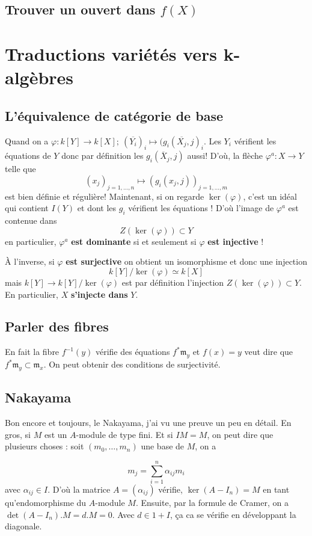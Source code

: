 \documentclass[a4paper,12pt]{book}
\newcommand{\m}{\mathfrak{m}}
\theoremstyle{plain}
\theoremstyle{definition}
\theoremstyle{remark}
\begin{document}
\section{Trouver un ouvert dans $f(X)$}

\chapter{Traductions variétés vers k-algèbres}
\section{L'équivalence de catégorie de base}
Quand on a $\varphi\colon k[Y]\to k[X];~(\overline{Y_i})_i\mapsto 
(g_i(\overline{X_j},j)_i$. Les $Y_i$ vérifient les équations de $Y$
donc par définition les $g_i(\overline{X}_j,j)$ aussi! D'où, la flèche 
$\varphi^a\colon X\to Y$ telle que 
\[(x_j)_{j=1,\ldots,n}\mapsto (g_i(x_j,j))_{j=1,\ldots, m}\]
est bien définie et régulière! Maintenant, si on regarde $\ker(\varphi)$,
c'est un idéal qui contient $I(Y)$ et dont les $g_i$ vérifient les 
équations ! D'où l'image de $\varphi^a$ est contenue dans 
\[Z(\ker(\varphi))\subset Y\]
en particulier, $\varphi^a$ \textbf{est dominante} si et seulement si 
$\varphi$ \textbf{est injective} !

À l'inverse, si $\varphi$ \textbf{est surjective} on obtient un
isomorphisme et donc une injection 
\[k[Y]/\ker(\varphi)\simeq k[X]\]
mais $k[Y]\to k[Y]/\ker(\varphi)$ est par définition l'injection 
$Z(\ker(\varphi))\subset Y$. En particulier, $X$ \textbf{s'injecte dans}
$Y$.
\section{Parler des fibres}
En fait la fibre $f^{-1}(y)$ vérifie des équations $f^*\m_y$ et 
$f(x)=y$ veut dire que $f^*\m_y\subset \m_x$. On peut obtenir 
des conditions de surjectivité.

\section{Nakayama}
Bon encore et toujours, le Nakayama, j'ai vu une preuve un peu en détail.
En gros, si $M$ est un $A$-module de type fini. Et si $IM=M$, on peut 
dire que plusieurs choses : soit $(m_0,\ldots, m_n)$ une base de $M$,
on a 

\[m_j = \sum_{i=1}^n \alpha_{ij}m_i\]
avec $\alpha_{ij}\in I$. D'où la matrice $A=(\alpha_{ij})$ vérifie,
$\ker(A-I_n)=M$ en tant qu'endomorphisme du $A$-module $M$. Ensuite, 
par la formule de Cramer, on a $\det(A-I_n).M=d.M=0$. Avec $d\in 1+I$, 
ça ca se vérifie en développant la diagonale. 
\end{document}
